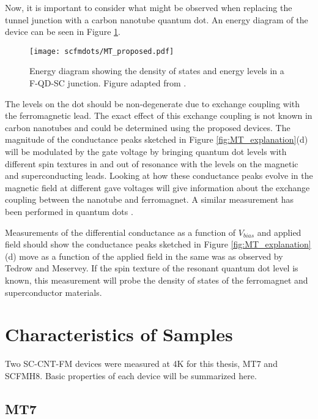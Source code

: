 Now, it is important to consider what might be observed when replacing the tunnel junction with a carbon nanotube quantum dot. An energy diagram of the device can be seen in Figure \ref{fig:MT_proposed}.

\begin{figure}
    \centering
    \texttt{[image: scfmdots/MT\_proposed.pdf]}
    \caption{Energy diagram showing the density of states and energy levels in a F-QD-SC junction. Figure adapted from \cite{Moodera2010}.}
    \label{fig:MT_proposed}
\end{figure}

The levels on the dot should be non-degenerate due to exchange coupling with the ferromagnetic lead. The exact effect of this exchange coupling is not known in carbon nanotubes and could be determined using the proposed devices. The magnitude of the conductance peaks sketched in Figure \ref{fig:MT_explanation}(d) will be modulated by the gate voltage by bringing quantum dot levels with different spin textures in and out of resonance with the levels on the magnetic and superconducting leads. Looking at how these conductance peaks evolve in the magnetic field at different gave voltages will give information about the exchange coupling between the nanotube and ferromagnet. A similar measurement has been performed in  quantum dots \cite{Hofstetter2010}. 

Measurements of the differential conductance as a function of $V_{bias}$ and applied field should show the conductance peaks sketched in Figure \ref{fig:MT_explanation}(d) move as a function of the applied field in the same was as observed by Tedrow and Meservey. If the spin texture of the resonant quantum dot level is known, this measurement will probe the density of states of the ferromagnet and superconductor materials.


\section{Characteristics of Samples}

Two SC-CNT-FM devices were measured at 4K for this thesis, MT7 and SCFMH8. Basic properties of each device will be summarized here.

\subsection*{MT7}

